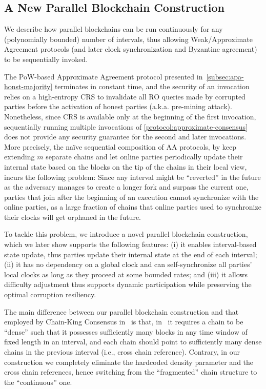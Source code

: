 \subsection{A New Parallel Blockchain Construction}
\label{subsec:new-parallel-blockchain}

We describe how parallel blockchains can be run continuously for any (polynomially bounded) number of intervals, thus allowing Weak/Approximate Agreement protocols (and later clock synchronization and Byzantine agreement) to be sequentially invoked.

The PoW-based Approximate Agreement protocol presented in~\cref{subsec:apa-honst-majority} terminates in constant time, and the security of an invocation relies on a high-entropy CRS to invalidate all RO queries made by corrupted parties before the activation of honest parties (a.k.a. pre-mining attack).
%
Nonetheless, since CRS is available only at the beginning of the first invocation, sequentially running multiple invocations of \cref{protocol:approximate-consensus} does not provide any security guarantee for the second and later invocations.
%
More precisely, the na\"ive sequential composition of AA protocols, by keep extending $m$ separate chains and let online parties periodically update their internal state based on the blocks on the tip of the chains in their local view, incurs the following problem:
%
Since any interval might be ``reverted'' in the future as the adversary manages to create a longer fork and surpass the current one, parties that join after the beginning of an execution cannot synchronize with the online parties, as a large fraction of chains that online parties used to synchronize their clocks will get orphaned in the future.

To tackle this problem, we introduce a novel parallel blockchain construction, which we later show supports the following features:
%
(i) it enables interval-based state update, thus parties update their internal state at the end of each interval;
%
(ii) it has no dependency on a global clock and can self-synchronize all parties' local clocks as long as they proceed at some bounded rates;
%
and (iii) it allows difficulty adjustment thus supports dynamic participation while preserving the optimal corruption resiliency.

The main difference between our parallel blockchain construction and that employed by Chain-King Consensus in~\cite{EC:GarKiaShe24} is that, in~\cite{EC:GarKiaShe24} it requires a chain to be ``dense'' such that it possesses sufficiently many blocks in any time window of fixed length in an interval, and each chain should point to sufficiently many dense chains in the previous interval (i.e., cross chain reference).
%
Contrary, in our construction we completely eliminate the hardcoded density parameter and the cross chain references, hence switching from the ``fragmented'' chain structure to the ``continuous'' one.

